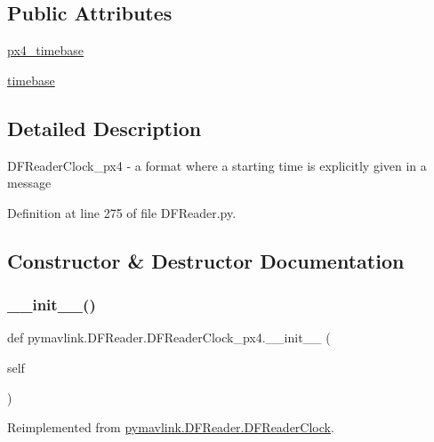 \subsection*{Public Attributes}
\begin{DoxyCompactItemize}
\item 
\mbox{\hyperlink{classpymavlink_1_1DFReader_1_1DFReaderClock__px4_a20353e6a66bef53c589cdaaf1c938503}{px4\+\_\+timebase}}
\item 
\mbox{\hyperlink{classpymavlink_1_1DFReader_1_1DFReaderClock__px4_abfe9c98727c4af5af57c7443f9d45382}{timebase}}
\end{DoxyCompactItemize}


\subsection{Detailed Description}
\begin{DoxyVerb}DFReaderClock_px4 - a format where a starting time is explicitly
given in a message\end{DoxyVerb}
 

Definition at line 275 of file D\+F\+Reader.\+py.



\subsection{Constructor \& Destructor Documentation}
\mbox{\label{classpymavlink_1_1DFReader_1_1DFReaderClock__px4_a6fb11e110087f31f5c7cce4b8ee95a36}} 
\subsubsection{\texorpdfstring{\_\_init\_\_()}{\_\_init\_\_()}}
{\footnotesize\ttfamily def pymavlink.\+D\+F\+Reader.\+D\+F\+Reader\+Clock\+\_\+px4.\+\_\+\+\_\+init\+\_\+\+\_\+ (\begin{DoxyParamCaption}\item[{}]{self }\end{DoxyParamCaption})}



Reimplemented from \mbox{\hyperlink{classpymavlink_1_1DFReader_1_1DFReaderClock_a99d4363951b5ef9866cbd021ca4dd80f}{pymavlink.\+D\+F\+Reader.\+D\+F\+Reader\+Clock}}.



